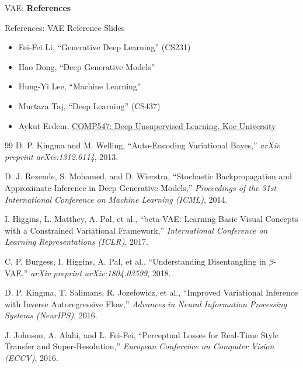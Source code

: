 \begin{frame}{}
	\LARGE VAE: \textbf{References}
\end{frame}

\begin{frame}[allowframebreaks]{References: VAE}
    Reference Slides
\begin{itemize}
    \item Fei-Fei Li, ``Generative Deep Learning'' (CS231)
    \item Hao Dong, ``Deep Generative Models''
    \item Hung-Yi Lee, ``Machine Learning''
    \item Murtaza Taj, ``Deep Learning'' (CS437)
    \item Aykut Erdem, \href{https://aykuterdem.github.io/classes/comp547.s24/}{COMP547: Deep Unsupervised Learning, Koc University}

\end{itemize}

\framebreak
    \begin{thebibliography}{99}
        D. P. Kingma and M. Welling,
        \newblock ``Auto-Encoding Variational Bayes,''
        \newblock \emph{arXiv preprint arXiv:1312.6114}, 2013.

        D. J. Rezende, S. Mohamed, and D. Wierstra,
        \newblock ``Stochastic Backpropagation and Approximate Inference in Deep Generative Models,''
        \newblock \emph{Proceedings of the 31st International Conference on Machine Learning (ICML)}, 2014.

        I. Higgins, L. Matthey, A. Pal, et al.,
        \newblock ``beta-VAE: Learning Basic Visual Concepts with a Constrained Variational Framework,''
        \newblock \emph{International Conference on Learning Representations (ICLR)}, 2017.

        C. P. Burgess, I. Higgins, A. Pal, et al.,
        \newblock ``Understanding Disentangling in $\beta$-VAE,''
        \newblock \emph{arXiv preprint arXiv:1804.03599}, 2018.

        D. P. Kingma, T. Salimans, R. Jozefowicz, et al.,
        \newblock ``Improved Variational Inference with Inverse Autoregressive Flow,''
        \newblock \emph{Advances in Neural Information Processing Systems (NeurIPS)}, 2016.

        J. Johnson, A. Alahi, and L. Fei-Fei,
        \newblock ``Perceptual Losses for Real-Time Style Transfer and Super-Resolution,''
        \newblock \emph{European Conference on Computer Vision (ECCV)}, 2016.


\end{thebibliography}
\end{frame}
